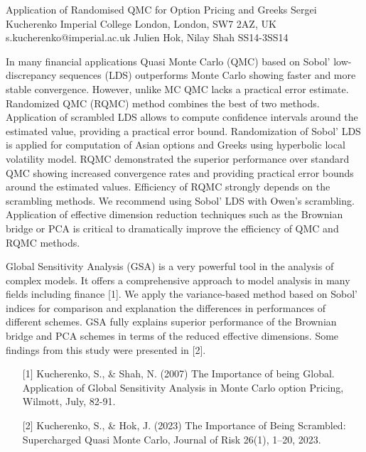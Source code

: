 \begin{talk}
  {Application of Randomised QMC for Option Pricing and Greeks}%
  {Sergei Kucherenko}%
  {Imperial College London, London, SW7 2AZ, UK}%
  {s.kucherenko@imperial.ac.uk}%
  {Julien Hok, Nilay Shah}%
{}{}{SS14-3}{SS14}

			
In many financial applications Quasi Monte Carlo (QMC) based on
Sobol’ low-discrepancy sequences (LDS) outperforms Monte Carlo
showing faster and more stable convergence.
However, unlike MC QMC lacks a practical error estimate. Randomized QMC (RQMC)
method combines the best of two methods.
Application of scrambled LDS allows to compute confidence intervals around the estimated value,
providing a practical error bound. Randomization of Sobol' LDS
is applied for computation of Asian options and Greeks
using hyperbolic local volatility model.
RQMC demonstrated the superior performance over standard QMC
showing increased convergence rates and providing
practical error bounds around the estimated values.
Efficiency of RQMC strongly depends on the scrambling methods. We recommend using
Sobol’ LDS with Owen’s scrambling. Application of effective dimension
reduction techniques such as the Brownian bridge or
PCA is critical to dramatically improve the efficiency of QMC and RQMC
methods.

Global Sensitivity Analysis (GSA) is a very powerful tool in the analysis of complex models. It offers a comprehensive approach to model analysis in many fields including finance [1].
We apply the variance-based method based on Sobol’ indices for comparison and explanation the differences in performances of different schemes.
GSA fully explains superior performance of the Brownian bridge and PCA schemes in terms of the reduced effective dimensions.
Some findings from this study were presented in [2]. 

\medskip


\begin{enumerate}
    \item[{[1]}]  Kucherenko, S., \& Shah, N. (2007) The Importance of being Global. Application of Global Sensitivity Analysis in Monte Carlo option Pricing, Wilmott, July, 82-91. 
	\item[{[2]}] Kucherenko, S., \& Hok, J. (2023) The Importance of Being Scrambled: Supercharged Quasi Monte Carlo, Journal of Risk 26(1), 1–20, 2023. 
    


\end{enumerate}

\end{talk}


